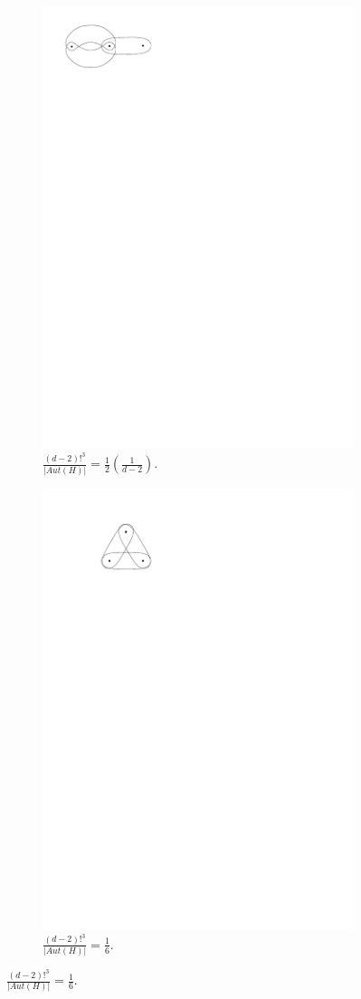 \documentclass[11pt,notitlepage,a4paper]{article}
\theoremstyle{definition}
\begin{document}
\begin{figure}[H]
\begin{subfigure}{.3\linewidth}
		\includegraphics[width=0.8\linewidth]{Graph3edge2.pdf}
		\caption{$\frac{(d-2)!^3}{|Aut(H)|}=\frac{1}{2}
			\left(\frac{1}{d-2}\right)$.}
	\end{subfigure}
	\hfill
	\begin{subfigure}{.3\linewidth}
	\centering
	\includegraphics[width=0.6\linewidth]{Graph3edge3.pdf}
	\caption{$\frac{(d-2)!^3}{|Aut(H)|}=\frac{1}{6}
		$.}
	\end{subfigure}
\end{figure}
\par
\end{document}
